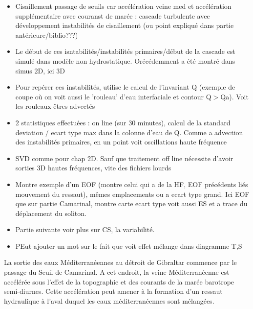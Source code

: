 

\begin{itemize}
\item Cisaillement passage de seuils car accélération veine med et accélération supplémentaire avec couranst de marée : cascade turbulente avec développement instabilités de cisaillement (ou point expliqué dans partie antérieure/biblio???)
\item Le début de ces isntabilités/instabilités primaires/début de la cascade est simulé dans modèle non hydrostatique. Orécédemment a été montré dans simus 2D, ici 3D
\item Pour repérer ces instabilités, utilise le calcul de l'invariant Q (exemple de coupe où on voit aussi le 'rouleau' d'eau interfaciale et contour Q$>$Qa). Voit les rouleaux êtres advectés
\item 2 statistiques effectuées : on line (sur 30 minutes), calcul de la standard deviation / ecart type max dans la colonne d'eau de Q. Comme a advection des instabilités primaires, en un point voit oscillations haute fréquence
\item SVD comme pour chap 2D. Sauf que traitement off line nécessite d'avoir sorties 3D hautes fréquences, vite des fichiers lourds
\item Montre exemple d'un EOF (montre celui qui a de la HF, EOF précédents liés mouvement du ressaut), mêmes emplacements ou a ecart type grand. Ici EOF que sur partie Camarinal, montre carte ecart type voit aussi ES et a trace du déplacement du soliton.
\item Partie suivante voir plus sur CS, la variabilité.
\item PEut ajouter un mot sur le fait que voit effet mélange dans diagramme T,S
\end{itemize}

La sortie des eaux Méditerranéennes au détroit de Gibraltar commence par le passage du Seuil de Camarinal. A cet endroit, la veine Méditerranéenne est accélérée sous l'effet de la topographie et des courants de la marée barotrope semi-diurnes. Cette accélération peut amener à la formation d'un ressaut hydraulique à l'aval duquel les eaux méditerranéennes sont mélangées. 

